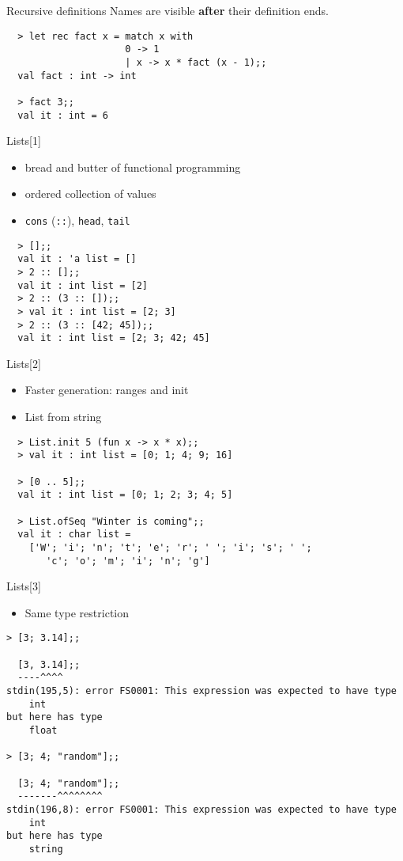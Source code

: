 \documentclass{beamer}
\begin{document}
\begin{frame}[fragile]{Recursive definitions}
  Names are visible \textbf{after} their definition ends.
  \begin{verbatim}
  > let rec fact x = match x with
                     0 -> 1
                     | x -> x * fact (x - 1);;
  val fact : int -> int

  > fact 3;;
  val it : int = 6
  \end{verbatim}
\end{frame}

\begin{frame}[fragile]{Lists[1]}
  \begin{itemize}
    \item bread and butter of functional programming
    \item ordered collection of values
    \item \texttt{cons} (\texttt{::}), \texttt{head}, \texttt{tail}
  \end{itemize}
  \begin{verbatim}
  > [];;
  val it : 'a list = []
  > 2 :: [];;
  val it : int list = [2]
  > 2 :: (3 :: []);;
  > val it : int list = [2; 3]
  > 2 :: (3 :: [42; 45]);;
  val it : int list = [2; 3; 42; 45]
  \end{verbatim}
\end{frame}

\begin{frame}[fragile]{Lists[2]}
  \begin{itemize}
    \item Faster generation: ranges and init
    \item List from string
  \end{itemize}
  \begin{verbatim}
  > List.init 5 (fun x -> x * x);;
  > val it : int list = [0; 1; 4; 9; 16]

  > [0 .. 5];;
  val it : int list = [0; 1; 2; 3; 4; 5]

  > List.ofSeq "Winter is coming";;
  val it : char list =
    ['W'; 'i'; 'n'; 't'; 'e'; 'r'; ' '; 'i'; 's'; ' ';
       'c'; 'o'; 'm'; 'i'; 'n'; 'g']
  \end{verbatim}
\end{frame}

\begin{frame}[fragile]{Lists[3]}
  \begin{itemize}
    \item Same type restriction
  \end{itemize}
  \tiny{
  \begin{verbatim}
> [3; 3.14];;

  [3, 3.14];;
  ----^^^^
stdin(195,5): error FS0001: This expression was expected to have type
    int    
but here has type
    float    

> [3; 4; "random"];;

  [3; 4; "random"];;
  -------^^^^^^^^
stdin(196,8): error FS0001: This expression was expected to have type
    int    
but here has type
    string
  \end{verbatim}
}
\end{frame}
\end{document}
